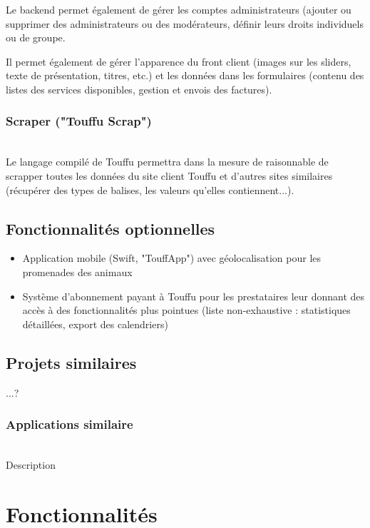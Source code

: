 \documentclass[conference]{IEEEtran}
\begin{document}
Le backend permet également de gérer les comptes administrateurs (ajouter ou supprimer des administrateurs ou des modérateurs, définir leurs droits individuels ou de groupe.

Il permet également de gérer l'apparence du front client (images sur les sliders, texte de présentation, titres, etc.) et les données dans les formulaires (contenu des listes des services disponibles, gestion et envois des factures).\\


\subsubsection{Scraper ("Touffu Scrap")}\hfill\\

Le langage compilé de Touffu permettra dans la mesure de raisonnable de scrapper toutes les données du site client Touffu et d'autres sites similaires (récupérer des types de balises, les valeurs qu'elles contiennent...).

\subsection{Fonctionnalités optionnelles}
\begin{itemize}
	\item Application mobile (Swift, "TouffApp") avec géolocalisation pour les promenades des animaux
	\item Système d'abonnement payant à Touffu pour les prestataires leur donnant des accès à des fonctionnalités plus pointues (liste non-exhaustive : statistiques détaillées, export des calendriers)
\end{itemize}



\subsection*{Projets similaires}

...?
\bigskip
\subsubsection{Applications similaire}
\hfil\\
Description

\section{Fonctionnalités}
\end{document}
